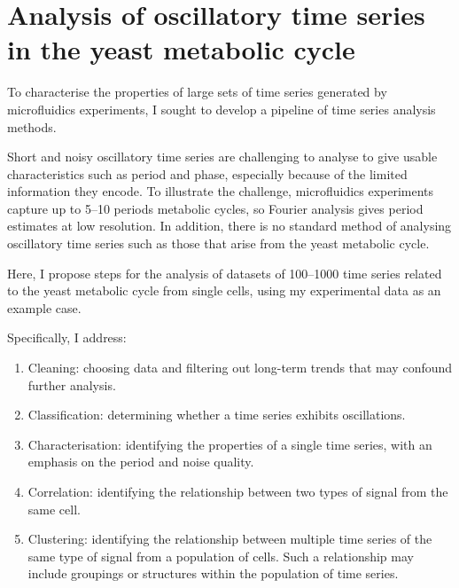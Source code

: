 
\chapter{Analysis of oscillatory time series in the yeast metabolic cycle}
\label{ch:analysis}

To characterise the properties of large sets of time series generated by microfluidics experiments, I sought to develop a pipeline of time series analysis methods.

Short and noisy oscillatory time series are challenging to analyse to give usable characteristics such as period and phase, especially because of the limited information they encode.
To illustrate the challenge, microfluidics experiments capture up to 5--10 periods metabolic cycles, so Fourier analysis gives period estimates at low resolution.
In addition, there is no standard method of analysing oscillatory time series such as those that arise from the yeast metabolic cycle.

Here, I propose steps for the analysis of datasets of 100--1000 time series related to the yeast metabolic cycle from single cells, using my experimental data as an example case.

Specifically, I address:
\begin{enumerate}
  \item Cleaning: choosing data and filtering out long-term trends that may confound further analysis.
  \item Classification: determining whether a time series exhibits oscillations.
  \item Characterisation: identifying the properties of a single time series, with an emphasis on the period and noise quality.
  \item Correlation: identifying the relationship between two types of signal from the same cell.
  \item Clustering: identifying the relationship between multiple time series of the same type of signal from a population of cells.
        Such a relationship may include groupings or structures within the population of time series.
\end{enumerate}

